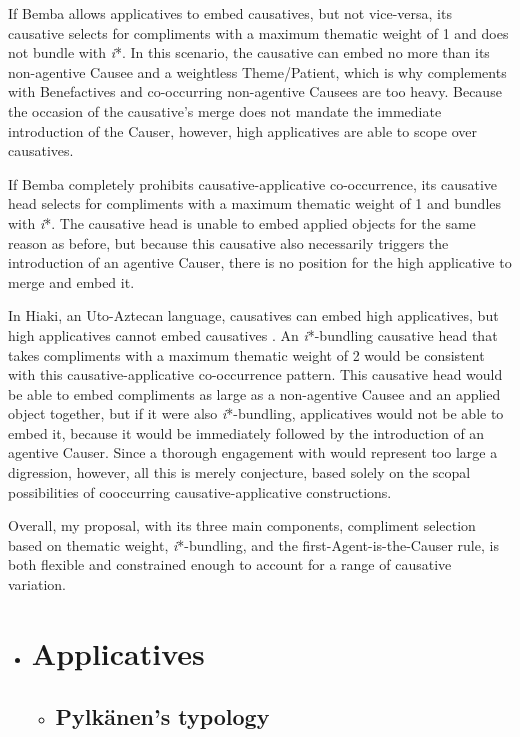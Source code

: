 \documentclass[output=paper,modfonts,nonflat]{langsci/langscibook}
\begin{document}
\begin{styleDefault}
If Bemba allows applicatives to embed causatives, but not vice-versa, its causative selects for compliments with a maximum thematic weight of 1 and does not bundle with \textit{i}*. In this scenario, the causative can embed no more than its non-agentive Causee and a weightless Theme/Patient, which is why complements with Benefactives and co-occurring non-agentive Causees are too heavy. Because the occasion of the causative’s merge does not mandate the immediate introduction of the Causer, however, high applicatives are able to scope over causatives. 
\end{styleDefault}

\begin{styleDefault}
If Bemba completely prohibits causative-applicative co-occurrence, its causative head selects for compliments with a maximum thematic weight of 1 and bundles with \textit{i}*. The causative head is unable to embed applied objects for the same reason as before, but because this causative also necessarily triggers the introduction of an agentive Causer, there is no position for the high applicative to merge and embed it. 
\end{styleDefault}

\begin{styleDefault}
In Hiaki, an Uto-Aztecan language, causatives can embed high applicatives, but high applicatives cannot embed causatives \citep{Jung2014}. An \textit{i}*-bundling causative head that takes compliments with a maximum thematic weight of 2 would be consistent with this causative-applicative co-occurrence pattern. This causative head would be able to embed compliments as large as a non-agentive Causee and an applied object together, but if it were also \textit{i}*-bundling, applicatives would not be able to embed it, because it would be immediately followed by the introduction of an agentive Causer. Since a thorough engagement with \citet{Jung2014} would represent too large a digression, however, all this is merely conjecture, based solely on the scopal possibilities of cooccurring causative-applicative constructions. 
\end{styleDefault}

Overall, my proposal, with its three main components, compliment selection based on thematic weight, \textit{i}*-bundling, and the first-Agent-is-the-Causer rule, is both flexible and constrained enough to account for a range of causative variation. 

\begin{itemize}
\item \section{Applicatives}

\begin{itemize}
\item \subsection{Pylkänen’s typology}
\end{itemize}
\end{itemize}
\end{document}
